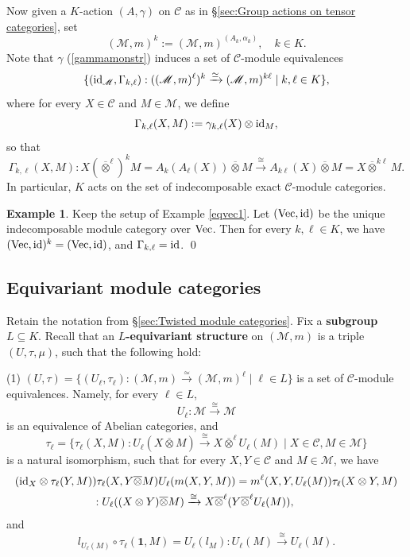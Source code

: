 \documentclass{amsart}
\theoremstyle{definition}
\newtheorem{example}[theorem]{Example}
\newcommand{\id}{{\rm id}}
\newcommand{\Vect}{{\rm Vec}}
\newcommand{\C}{\mathscr{C}}
\newcommand{\M}{\mathscr{M}}
\newcommand{\ot}{\otimes}
\numberwithin{equation}{section}
\begin{document}
Now given a $K$-action $(A,\gamma)$ on $\C$ as in \S\ref{sec:Group actions on tensor categories}, set  
\begin{equation}\label{M^k}
(\M ,m)^k:=(\M,m)^{(A_k,\alpha_k)},\quad k\in K.
\end{equation}
Note that $\gamma$ (\ref{gammamonstr}) induces a set of $\C$-module equivalences 
$$
\{(\id_{\M},\Gamma_{k,\ell}):((\M,m)^{\ell})^{k}\xrightarrow{\simeq}(\M,m)^{k\ell}\mid k,\ell\in K\},
$$
where for every $X\in\C$ and $M\in \M$, we define 
$$\Gamma_{k,\ell}(X,M):=\gamma_{k,\ell}(X)\ot {\rm id}_M,$$
so that
\begin{equation}\label{Gamma}
\Gamma_{k,\ell}(X,M):X(\overline{\ot}^{\ell})^k M=A_{k}(A_{\ell}(X))\overline{\ot}M\xrightarrow{\cong}A_{k\ell}(X)\overline{\ot}M=X\overline{\ot}^{k\ell} M.
\end{equation}  
In particular, $K$ acts on the set of indecomposable exact $\C$-module categories.

\begin{example}\label{eqvec2}
Keep the setup of Example \ref{eqvec1}. Let $(\Vect,\id)$ be the unique indecomposable module category over $\Vect$. Then for every $k,\ell\in K$, we have 
$(\Vect,\id)^k=(\Vect,\id)$, and 
$\Gamma_{k,\ell}=\id$. \qed 
\end{example}

\subsection{Equivariant module categories}\label{sec:Equivariant module categories}
Retain the notation from \S\ref{sec:Twisted module categories}. Fix a {\bf subgroup} $L\subseteq K$. Recall \cite{ENO} that an {\bf $L$-equivariant structure} on $(\M,m)$ is a triple $(U,\tau,\mu)$, such that the following hold:

(1) $(U,\tau)=\{(U_{\ell},\tau_{\ell}):(\M,m)\xrightarrow{\simeq} (\M,m)^{\ell}\mid \ell\in L\}$ 
is a set of $\C$-module equivalences. Namely, for every $\ell\in L$,
$$U_{\ell}:\M\xrightarrow{\cong} \M$$
is an equivalence of Abelian categories, and 
$$\tau_{\ell}=\{\tau_{\ell}(X,M):U_{\ell}(X\overline{\ot}M)\xrightarrow{\cong} X\overline{\ot}^{\ell}U_{\ell}(M)\mid X\in\C,M\in\M\}$$
is a natural isomorphism, such that for every $X,Y\in\C$ and $M\in\M$, we have
\begin{equation}\label{tauass}
\begin{split}
& (\id_X\ot \tau_{\ell}(Y,M))\tau_{\ell}(X,Y\overline{\ot}M) U_{\ell}(m(X,Y,M))= m^{\ell}(X,Y,U_{\ell}(M))\tau_{\ell}(X\ot Y,M)\\
& \qquad \qquad\qquad\quad:U_{\ell}((X\ot Y)\overline{\ot} M)\xrightarrow{\cong} X\overline{\ot}^{\ell}(Y\overline{\ot}^{\ell} U_{\ell}(M)),
\end{split}
\end{equation}
and
\begin{equation}\label{tauunit}
l_{U_{\ell}(M)}\circ\tau_{\ell}(\mathbf{1},M)=U_{\ell}(l_M):U_{\ell}(M)\xrightarrow{\cong} U_{\ell}(M).
\end{equation}
\end{document}
